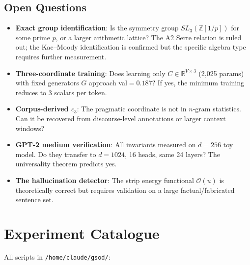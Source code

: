 \documentclass[11pt,a4paper]{article}
\begin{document}
\subsection{Open Questions}

\begin{itemize}
  \item \textbf{Exact group identification}: Is the symmetry group
        $SL_3(\mathbb{Z}[1/p])$ for some prime $p$, or a larger
        arithmetic lattice?  The A2 Serre relation is ruled out;
        the Kac--Moody identification is confirmed but the specific
        algebra type requires further measurement.
  \item \textbf{Three-coordinate training}: Does learning only $C \in
        \mathbb{R}^{V \times 3}$ (2,025 params) with fixed generators $G$
        approach val${=}0.187$?  If yes, the minimum training reduces
        to 3 scalars per token.
  \item \textbf{Corpus-derived $c_3$}: The pragmatic coordinate is not
        in $n$-gram statistics.  Can it be recovered from discourse-level
        annotations or larger context windows?
  \item \textbf{GPT-2 medium verification}: All invariants measured on
        $d{=}256$ toy model.  Do they transfer to $d{=}1024$, 16 heads,
        same 24 layers?  The universality theorem predicts yes.
  \item \textbf{The hallucination detector}: The strip energy functional
        $\mathcal{O}(u)$ is theoretically correct but requires validation
        on a large factual/fabricated sentence set.
\end{itemize}

\appendix
\section{Experiment Catalogue}
\label{app:experiments}

All scripts in \texttt{/home/claude/gsod/}:
\end{document}

